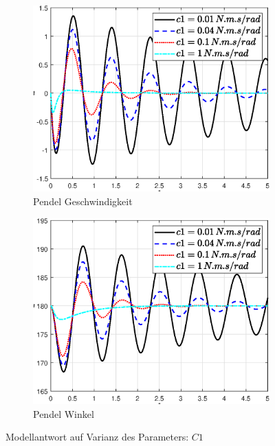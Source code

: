 \begin{figure}
    \begin{subfigure}[b]{0.49\linewidth}
        \includegraphics[width=\linewidth]{Bilder/5_sensi/fig/c1/theta_punkt.eps}
        \caption{Pendel Geschwindigkeit}
        \label{fig:c1_theta_punkt}      
    \end{subfigure}
    \begin{subfigure}[b]{0.49\linewidth}
        \includegraphics[width=\linewidth]{Bilder/5_sensi/fig/c1/theta.eps}
        \caption{Pendel Winkel}
        \label{fig:c1_theta}
    \end{subfigure}
        \caption{Modellantwort auf Varianz des Parameters: $C1$}
        \label{fig:c1}
\end{figure}

